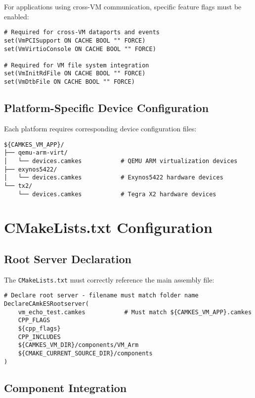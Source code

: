 \documentclass[12pt,a4paper]{article}
\begin{document}
For applications using cross-VM communication, specific feature flags must be enabled:

\begin{lstlisting}[style=cmake, caption=Cross-VM connector feature flags]
# Required for cross-VM dataports and events
set(VmPCISupport ON CACHE BOOL "" FORCE)
set(VmVirtioConsole ON CACHE BOOL "" FORCE)

# Required for VM file system integration  
set(VmInitRdFile ON CACHE BOOL "" FORCE)
set(VmDtbFile ON CACHE BOOL "" FORCE)
\end{lstlisting}

\subsection{Platform-Specific Device Configuration}

Each platform requires corresponding device configuration files:

\begin{lstlisting}[style=bash, caption=Platform device configuration structure]
${CAMKES_VM_APP}/
├── qemu-arm-virt/
│   └── devices.camkes           # QEMU ARM virtualization devices
├── exynos5422/  
│   └── devices.camkes           # Exynos5422 hardware devices
└── tx2/
    └── devices.camkes           # Tegra X2 hardware devices
\end{lstlisting}

\section{CMakeLists.txt Configuration}

\subsection{Root Server Declaration}

The \texttt{CMakeLists.txt} must correctly reference the main assembly file:

\begin{lstlisting}[style=cmake, caption=Correct root server declaration]
# Declare root server - filename must match folder name
DeclareCAmkESRootserver(
    vm_echo_test.camkes           # Must match ${CAMKES_VM_APP}.camkes
    CPP_FLAGS
    ${cpp_flags}
    CPP_INCLUDES
    ${CAMKES_VM_DIR}/components/VM_Arm
    ${CMAKE_CURRENT_SOURCE_DIR}/components
)
\end{lstlisting}

\subsection{Component Integration}
\end{document}
